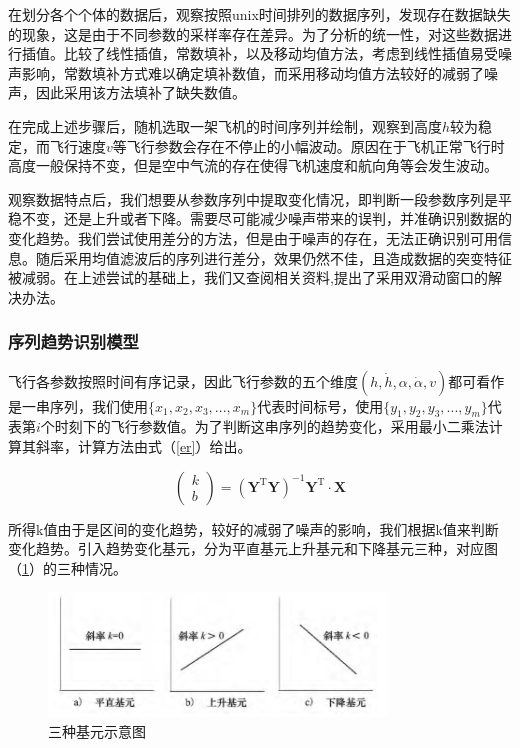 \documentclass{my_paper}
\begin{document}
在划分各个个体的数据后，观察按照unix时间排列的数据序列，发现存在数据缺失的现象，这是由于不同参数的采样率存在差异。为了分析的统一性，对这些数据进行插值。比较了线性插值，常数填补，以及移动均值方法，考虑到线性插值易受噪声影响，常数填补方式难以确定填补数值，而采用移动均值方法较好的减弱了噪声，因此采用该方法填补了缺失数值。

在完成上述步骤后，随机选取一架飞机的时间序列并绘制，观察到高度$h$较为稳定，而飞行速度$v$等飞行参数会存在不停止的小幅波动。原因在于飞机正常飞行时高度一般保持不变，但是空中气流的存在使得飞机速度和航向角等会发生波动。

观察数据特点后，我们想要从参数序列中提取变化情况，即判断一段参数序列是平稳不变，还是上升或者下降。需要尽可能减少噪声带来的误判，并准确识别数据的变化趋势。我们尝试使用差分的方法，但是由于噪声的存在，无法正确识别可用信息。随后采用均值滤波后的序列进行差分，效果仍然不佳，且造成数据的突变特征被减弱。在上述尝试的基础上，我们又查阅相关资料\cite{9},提出了采用双滑动窗口的解决办法。

\subsubsection{序列趋势识别模型}

飞行各参数按照时间有序记录，因此飞行参数的五个维度$(h,\dot{h},\alpha,\dot{\alpha},v )$都可看作是一串序列，我们使用$\{x_1,x_2,x_3,...,x_m\}$代表时间标号，使用$\{y_1,y_2,y_3,...,y_m\}$代表第$i$个时刻下的飞行参数值。为了判断这串序列的趋势变化，采用最小二乘法计算其斜率，计算方法由式（\ref{er}）给出。

\begin{equation}
    \left(\begin{array}{l}k \\b\end{array}\right)=\left(\boldsymbol{Y}^{\mathrm{T}} \boldsymbol{Y}\right)^{-1} \boldsymbol{Y}^{\mathrm{T}} \cdot \boldsymbol{X}
\label{er}
\end{equation}

所得k值由于是区间的变化趋势，较好的减弱了噪声的影响，我们根据k值来判断变化趋势。引入趋势变化基元，分为平直基元上升基元和下降基元三种，对应图（\ref{jiyuan}）的三种情况。

\begin {figure}[h]
\centering %
\includegraphics[width=0.8\textwidth]{jiyuan.png}
\caption{三种基元示意图} %
\label{jiyuan}
\end {figure}
\end{document}
